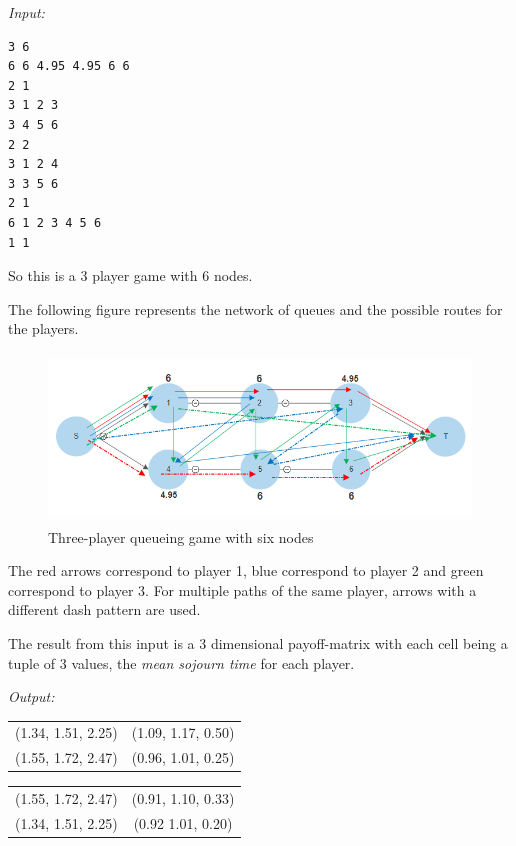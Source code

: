 \begin{example}
\textit{Input:}
\begin{verbatim}
3 6
6 6 4.95 4.95 6 6
2 1
3 1 2 3
3 4 5 6
2 2
3 1 2 4
3 3 5 6
2 1
6 1 2 3 4 5 6
1 1
\end{verbatim}

So this is a 3 player game with 6 nodes.

The following figure represents the network of queues and the possible routes for the players. \\

\begin{figure}[!htbp]
\includegraphics[height=4.5cm]{Example2.png}
\caption{Three-player queueing game with six nodes}
\end{figure}



The red arrows correspond to player 1, blue correspond to player 2 and green correspond to player 3. For multiple paths of the same player, arrows with a different dash pattern are used.

The result from this input is a 3 dimensional payoff-matrix with each cell being a tuple of 3 values, the \textit{mean sojourn time} for each player.

\textit{Output:}
\begin{table}[!htbp]
    \begin{tabular}{|cc|}
    (1.34, 1.51, 2.25) & (1.09, 1.17, 0.50) \\
    (1.55, 1.72, 2.47) & (0.96, 1.01, 0.25)
    \end{tabular}
    \qquad
    \begin{tabular}{|cc|}
    (1.55, 1.72, 2.47) & (0.91, 1.10, 0.33) \\
    (1.34, 1.51, 2.25) & (0.92 1.01, 0.20)
    \end{tabular}    
    

\end{table}
\end{example}
